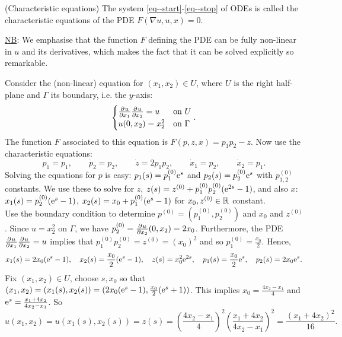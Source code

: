 \documentclass[11pt]{article}
\begin{document}
			\begin{defi}
				(Characteristic equations) The system \eqref{eq--start}-\eqref{eq--stop} of ODEs is called the characteristic equations of the PDE $F(\nabla u, u, x)=0$.
			\end{defi}

			\noindent\underline{NB}: We emphasise that the function $F$ defining the PDE can be fully non-linear in $u$ and its derivatives, which makes the fact that it can be solved explicitly so remarkable.

			\begin{eg}
				Consider the (non-linear) equation for $(x_1,x_2)\in U$, where $U$ is the right half-plane and $\Gamma$ its boundary, i.e. the $y$-axis:
				\begin{equation*}
					\begin{cases}
						\frac{\partial^{} u}{\partial x_1}\frac{\partial^{} u}{\partial x_2}=u & \text{on }U\\
						u(0,x_2)=x_2^2 & \text{on }\Gamma	
					\end{cases}.
				\end{equation*}
				The function $F$ associated to this equation is $F(p,z,x)=p_1p_2-z$. Now use the characteristic equations:
				\begin{equation*}
					\dot{p}_1=p_1,\qquad\dot{p}_2=p_2,\qquad\dot{z}=2p_1p_2,\qquad\dot{x}_1=p_2,\qquad\dot{x}_2=p_1.
				\end{equation*}
				Solving the equations for $p$ is easy: $p_1(s)=p_1^{(0)}\mathrm{e}^{s}$ and $p_2(s)=p_2^{(0)}\mathrm{e}^{s}$ with $p_{1,2}^{(0)}$ constants. We use these to solve for $z$, $z(s)=z^{(0)}+p_1^{(0)}p_2^{(0)}(\mathrm{e}^{2s}-1)$, and also $x$: $x_1(s)=p_2^{(0)}(\mathrm{e}^{s}-1)$, $x_2(s)=x_0+p_1^{(0)}(\mathrm{e}^{s}-1)$ for $x_0,z^{(0)}\in\mathbb{R}$ constant.\\
				Use the boundary condition to determine $p^{(0)}=(p_1^{(0)},p_2^{(0)})$ and $x_0$ and $z^{(0)}$. Since $u=x_2^2$ on $\Gamma$, we have $p_2^{(0)}=\frac{\partial^{} u}{\partial x_2}(0,x_2)=2x_0$. Furthermore, the PDE $\frac{\partial^{} u}{\partial x_1}\frac{\partial^{} u}{\partial x_2}=u$ implies that $p_1^{(0)}p_2^{(0)}=z^{(0)}=(x_0)^2$ and so $p_1^{(0)}=\frac{x_0}{2}$. Hence, 
				\begin{equation*}
					x_1(s)=2x_0(\mathrm{e}^{s}-1),\quad x_2(s)=\frac{x_0}{2}(\mathrm{e}^{s}-1),\quad z(s)=x_0^2\mathrm{e}^{2s},\quad p_1(s)=\frac{x_0}{2}\mathrm{e}^{s},\quad p_2(s)=2x_0\mathrm{e}^{s}.
				\end{equation*}
				Fix $(x_1,x_2)\in U$, choose $s,x_0$ so that $(x_1,x_2)=(x_1(s),x_2(s))=(2x_0(\mathrm{e}^{s}-1),\frac{x_0}{2}(\mathrm{e}^{s}+1))$. This implies $x_0=\frac{4x_2-x_1}{4}$ and $\mathrm{e}^{s}=\frac{x_1+4x_2}{4x_2-x_1}$. So
				\begin{equation*}
					u(x_1,x_2)=u(x_1(s),x_2(s))=z(s)=\left(\frac{4x_2-x_1}{4}\right)^2\left(\frac{x_1+4x_2}{4x_2-x_1}\right)^2=\frac{(x_1+4x_2)^2}{16}.
				\end{equation*}
			\end{eg}
\end{document}
